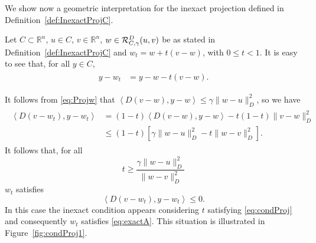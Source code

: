 We show now a geometric interpretation for the inexact projection defined in Definition~\ref{def:InexactProjC}.
\begin{remark}\normalfont
	Let $C\subset \mathbb{R}^n$, $u\in C$, $v\in \mathbb{R}^n$, $w\in{\cal R}_{C,\gamma}^{D}(u, v)$ be as stated in Definition~\ref{def:InexactProjC} and $w_t = w+t(v-w)$, with $0\leq t <1$. It is easy to see that, for all $y\in C$,
	\begin{align*}
		\begin{aligned}
			y-w_t & = y-w - t(v-w).
		\end{aligned}
	\end{align*}
\end{remark}
It follows from \eqref{eq:Projw} that $\left\langle D(v-w), y-w \right\rangle \leq \gamma \|w-u\|_{D}^2$, so we have
\begin{align*}
	\begin{aligned}
		\left\langle D(v-w_t), y-w_t \right\rangle & = (1-t)\left\langle D(v-w), y-w \right\rangle - t(1-t)\|v-w\|_D^{2} \\
		                                           & \leq  (1-t)\left[ \gamma \|w-u\|_D^2 - t\|w-v\|_D^2 \right].
	\end{aligned}
\end{align*}
It follows that, for all 
\begin{equation}\label{eq:condProj}
	t\geq \frac{\gamma\|w-u\|_D^2}{\|w-v\|_D^2}
\end{equation}
$w_t$ satisfies 
$$
\left\langle D(v-w_t), y-w_t \right\rangle\leq 0.
$$
In this case the inexact condition appears considering $t$ satisfying \eqref{eq:condProj} and consequently $w_t$ satisfies \eqref{eq:exactA}.  This situation is illustrated in Figure~\ref{fig:condProj1}.


